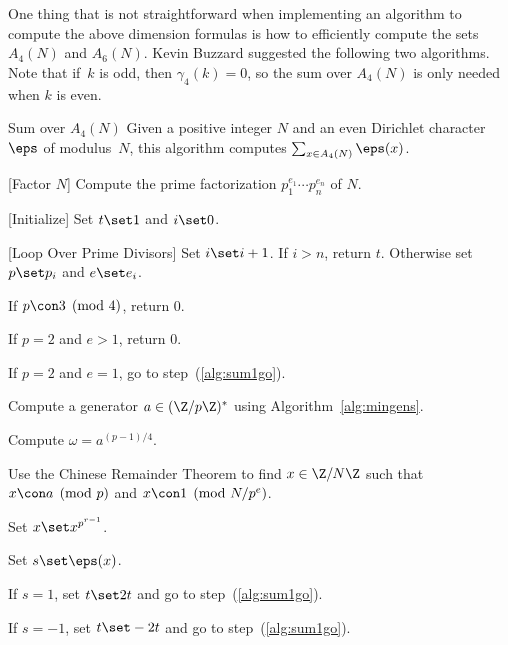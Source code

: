 One thing that is not straightforward when implementing an algorithm
to compute the above dimension formulas is how to efficiently compute
the sets $A_4(N)$ and $A_6(N)$.  Kevin Buzzard suggested the
following two algorithms.  Note that if~$k$
is odd, then $\gamma_4(k)=0$, so the sum over
$A_4(N)$ is only needed when $k$ is even.  
\begin{algorithm}{Sum over $A_4(N)$}\label{alg:suma4}
Given a positive integer $N$ and an even 
Dirichlet character $\eps$ of modulus~$N$,
this algorithm computes  $\sum_{x \in A_4(N)} \eps(x)$.
\begin{steps}
\item{}[Factor $N$]  Compute the prime factorization 
$p_1^{e_1} \cdots p_n^{e_n}$ of $N$.
\item{}[Initialize] Set $t\set 1$ and $i\set 0$.
\item{}[Loop Over Prime Divisors]\label{alg:sum1go} Set $i\set i+1$.
If $i>n$, return $t$.  Otherwise 
set $p\set p_i$ and $e\set e_i$.
\begin{steps}
\item\label{alg:a4_3a} If $p\con 3\pmod{4}$, return $0$.
\item\label{alg:a4_3b} If $p=2$ and $e>1$, return $0$.
\item If $p=2$ and $e=1$, go to step~(\ref{alg:sum1go}).
\item\label{alg:a4_3d} Compute a generator $a\in (\Z/p\Z)^*$ using
Algorithm~\ref{alg:mingens}.
\item Compute $\omega = a^{(p-1)/4}$.
\item Use the Chinese Remainder Theorem to find $x\in\Z/N\Z$
such that $x\con a\pmod{p}$ and $x\con 1\pmod{N/p^e}$.
\item\label{alg:a4_3g} Set $x \set x^{p^{r-1}}$.
\item\label{alg:a4_3h} Set $s\set \eps(x)$.
\item\label{alg:a4_3i} If $s=1$, set $t\set 2t$ and go to 
step~(\ref{alg:sum1go}).
\item\label{alg:a4_3j} If $s=-1$, set $t\set -2t$ and go to 
step~(\ref{alg:sum1go}).
\end{steps}
\end{steps}
\end{algorithm}
